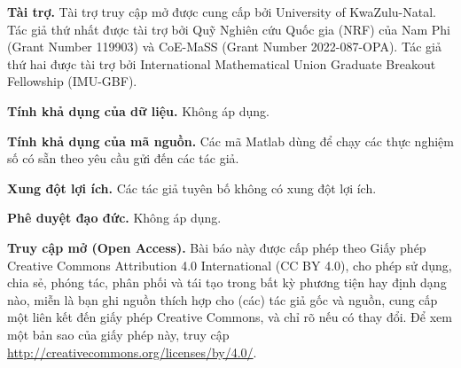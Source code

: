 \documentclass[11pt,a4paper]{article}
\theoremstyle{plain}
\theoremstyle{definition}
\theoremstyle{remark}
\numberwithin{equation}{section}
\begin{document}
\medskip
\noindent\textbf{Tài trợ.} Tài trợ truy cập mở được cung cấp bởi University of KwaZulu-Natal. Tác giả thứ nhất được tài trợ bởi Quỹ Nghiên cứu Quốc gia (NRF) của Nam Phi (Grant Number 119903) và CoE-MaSS (Grant Number 2022-087-OPA). Tác giả thứ hai được tài trợ bởi International Mathematical Union Graduate Breakout Fellowship (IMU-GBF).

\medskip
\noindent\textbf{Tính khả dụng của dữ liệu.} Không áp dụng.

\medskip
\noindent\textbf{Tính khả dụng của mã nguồn.} Các mã Matlab dùng để chạy các thực nghiệm số có sẵn theo yêu cầu gửi đến các tác giả.

\medskip
\noindent\textbf{Xung đột lợi ích.} Các tác giả tuyên bố không có xung đột lợi ích.

\medskip
\noindent\textbf{Phê duyệt đạo đức.} Không áp dụng.

\medskip
\noindent\textbf{Truy cập mở (Open Access).} Bài báo này được cấp phép theo Giấy phép Creative Commons Attribution 4.0 International (CC BY 4.0), cho phép sử dụng, chia sẻ, phóng tác, phân phối và tái tạo trong bất kỳ phương tiện hay định dạng nào, miễn là bạn ghi nguồn thích hợp cho (các) tác giả gốc và nguồn, cung cấp một liên kết đến giấy phép Creative Commons, và chỉ rõ nếu có thay đổi. Để xem một bản sao của giấy phép này, truy cập \url{http://creativecommons.org/licenses/by/4.0/}.
\end{document}
